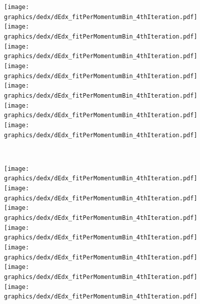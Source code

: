 \begin{figure}[ht]
\ContinuedFloat%
\centering%
\parbox{0.495\textwidth}{
  \centering
  \texttt{[image: graphics/dedx/dEdx\_fitPerMomentumBin\_4thIteration.pdf]}\\[3pt]
  \texttt{[image: graphics/dedx/dEdx\_fitPerMomentumBin\_4thIteration.pdf]}\\[3pt]
  \texttt{[image: graphics/dedx/dEdx\_fitPerMomentumBin\_4thIteration.pdf]}\\[3pt]
  \texttt{[image: graphics/dedx/dEdx\_fitPerMomentumBin\_4thIteration.pdf]}\\[3pt]
  \texttt{[image: graphics/dedx/dEdx\_fitPerMomentumBin\_4thIteration.pdf]}\\[3pt]
  \texttt{[image: graphics/dedx/dEdx\_fitPerMomentumBin\_4thIteration.pdf]}\\[3pt]
  \texttt{[image: graphics/dedx/dEdx\_fitPerMomentumBin\_4thIteration.pdf]}
}~
\parbox{0.495\textwidth}{
  \centering
  \texttt{[image: graphics/dedx/dEdx\_fitPerMomentumBin\_4thIteration.pdf]}\\[3pt]
  \texttt{[image: graphics/dedx/dEdx\_fitPerMomentumBin\_4thIteration.pdf]}\\[3pt]
  \texttt{[image: graphics/dedx/dEdx\_fitPerMomentumBin\_4thIteration.pdf]}\\[3pt]
  \texttt{[image: graphics/dedx/dEdx\_fitPerMomentumBin\_4thIteration.pdf]}\\[3pt]
  \texttt{[image: graphics/dedx/dEdx\_fitPerMomentumBin\_4thIteration.pdf]}\\[3pt]
  \texttt{[image: graphics/dedx/dEdx\_fitPerMomentumBin\_4thIteration.pdf]}\\[3pt]
  \texttt{[image: graphics/dedx/dEdx\_fitPerMomentumBin\_4thIteration.pdf]}
}%
\end{figure}


